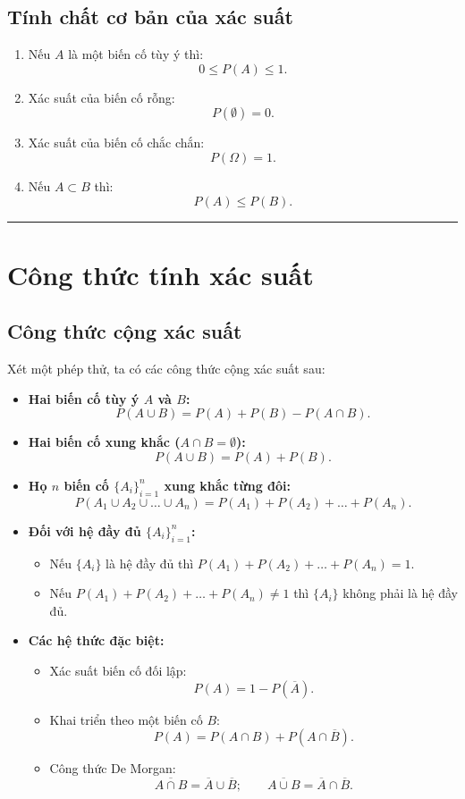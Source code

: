 \documentclass[12pt,a4paper]{article}
\theoremstyle{definition}
\begin{document}
\subsection{Tính chất cơ bản của xác suất}
\begin{enumerate}[label=\arabic*), leftmargin=1.5em]
    \item Nếu $A$ là một biến cố tùy ý thì:
    \[
    0 \le P(A) \le 1.
    \]
    \item Xác suất của biến cố rỗng:
    \[
    P(\emptyset) = 0.
    \]
    \item Xác suất của biến cố chắc chắn:
    \[
    P(\Omega) = 1.
    \]
    \item Nếu $A \subset B$ thì:
    \[
    P(A) \le P(B).
    \]
\end{enumerate}

\vspace{1em}
\hrule
\vspace{1.5em}

\section{Công thức tính xác suất}

\subsection{Công thức cộng xác suất}
Xét một phép thử, ta có các công thức cộng xác suất sau:
\begin{itemize}[leftmargin=1.5em]
    \item \textbf{Hai biến cố tùy ý $A$ và $B$:}
    \[
    P(A \cup B) = P(A) + P(B) - P(A \cap B).
    \]
    \item \textbf{Hai biến cố xung khắc ($A \cap B = \emptyset$):}
    \[
    P(A \cup B) = P(A) + P(B).
    \]
    \item \textbf{Họ $n$ biến cố $\{A_i\}_{i=1}^n$ xung khắc từng đôi:}
    \[
    P(A_1 \cup A_2 \cup \dots \cup A_n) = P(A_1) + P(A_2) + \dots + P(A_n).
    \]
    \item \textbf{Đối với hệ đầy đủ $\{A_i\}_{i=1}^n$:}
    \begin{itemize}
        \item Nếu $\{A_i\}$ là hệ đầy đủ thì $P(A_1) + P(A_2) + \dots + P(A_n) = 1$.
        \item Nếu $P(A_1) + P(A_2) + \dots + P(A_n) \ne 1$ thì $\{A_i\}$ không phải là hệ đầy đủ.
    \end{itemize}
    \item \textbf{Các hệ thức đặc biệt:}
    \begin{itemize}
        \item Xác suất biến cố đối lập:
        \[
        P(A) = 1 - P(\overline{A}).
        \]
        \item Khai triển theo một biến cố $B$:
        \[
        P(A) = P(A \cap B) + P(A \cap \overline{B}).
        \]
        \item Công thức De Morgan:
        \[
        \overline{A \cap B} = \overline{A} \cup \overline{B}; \qquad \overline{A \cup B} = \overline{A} \cap \overline{B}.
        \]
    \end{itemize}
\end{itemize}
\end{document}
